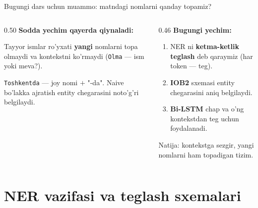 \documentclass[aspectratio=169,11pt]{beamer}
\begin{document}
\begin{frame}{Bugungi dars uchun muammo: matndagi nomlarni qanday topamiz?}
  \begin{columns}[T]
    \begin{column}{0.50\textwidth}
      \textbf{Sodda yechim qayerda qiynaladi:}\\[3pt]
      \small
      \begin{tcolorbox}[warnbox,title={Lug'at qidiruvi yetarli emas},top=2pt,bottom=2pt]
        \footnotesize
        Tayyor ismlar ro'yxati \textbf{yangi} nomlarni topa olmaydi va kontekstni
        ko'rmaydi (\texttt{Olma} --- ism yoki meva?).
      \end{tcolorbox}
      \vspace{3pt}
      \begin{tcolorbox}[warnbox,title={Qo'shimchalar chegarani buzadi},top=2pt,bottom=2pt]
        \footnotesize
        \texttt{Toshkentda} --- joy nomi $+$ "-da". Naive bo'lakka ajratish entity
        chegarasini noto'g'ri belgilaydi.
      \end{tcolorbox}
    \end{column}
    \begin{column}{0.46\textwidth}
      \textbf{Bugungi yechim:}\\[4pt]
      \small
      \begin{enumerate}\setlength\itemsep{4pt}
        \item NER ni \textbf{ketma-ketlik teglash} deb qaraymiz (har token --- teg).
        \item \textbf{IOB2} sxemasi entity chegarasini aniq belgilaydi.
        \item \textbf{Bi-LSTM} chap va o'ng kontekstdan teg uchun foydalanadi.
      \end{enumerate}
      \vspace{5pt}
      \begin{tcolorbox}[okbox,top=2pt,bottom=2pt]
        \footnotesize
        Natija: kontekstga sezgir, yangi nomlarni ham topadigan tizim.
      \end{tcolorbox}
    \end{column}
  \end{columns}
\end{frame}

\section[Teglash]{NER vazifasi va teglash sxemalari}
\end{document}
